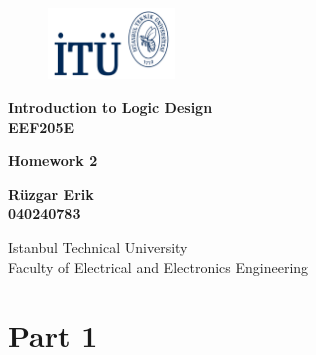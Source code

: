 \documentclass[table]{article}
\def\mytitle{Homework 2}
\begin{document}
\begin{titlepage}
    \begin{figure}[h] %
        \begin{flushright}
        \includegraphics[width=0.3\textwidth]{logo_laci.png} %
            
        \end{flushright}
        \hfill
    \end{figure}

    \centering
    \vspace*{1in}
    
    \Huge
    \textbf{Introduction to Logic Design} \\
    \textbf{EEF205E} \\

    \vspace{0.5in}

    \Large
    \textbf{\mytitle} \\
    
    \vspace{0.5in}

    \large
    \textbf{Rüzgar Erik} \\
    \textbf{040240783} \\

    \vspace{0.5in}
    
    \Large
    Istanbul Technical University \\
    Faculty of Electrical and Electronics Engineering \\
    
    \vfill


\end{titlepage}



\section*{Part 1}
\end{document}
